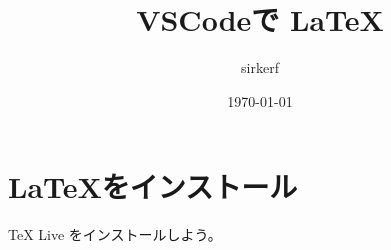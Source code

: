 \documentclass[a4paper,11pt]{jsarticle}
\begin{document}
\title{VSCodeで \LaTeX}
\author{sirkerf}
\date{\today}
\maketitle

\section{\LaTeX をインストール}
TeX Live をインストールしよう。
\end{document}
